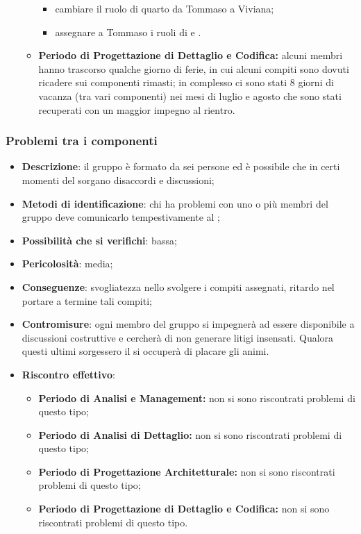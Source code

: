 \begin{itemize}
\begin{itemize}
\begin{itemize}
						\item cambiare il ruolo di quarto \PRJ {} da Tommaso a Viviana;
						\item assegnare a Tommaso i ruoli di \VER{} e \AN.
					\end{itemize}
            \item \textbf{Periodo di Progettazione di Dettaglio e Codifica:} alcuni membri hanno trascorso qualche giorno di ferie, in cui alcuni compiti sono dovuti ricadere sui componenti rimasti; in complesso ci sono stati 8 giorni di vacanza (tra vari componenti) nei mesi di luglio e agosto che sono stati recuperati con un maggior impegno al rientro.
			\end{itemize}
		\end{itemize}


		\subsubsection{Problemi tra i componenti}
		\begin{itemize}
			\item \textbf{Descrizione}: il gruppo è formato da sei persone ed è possibile che in certi momenti del  sorgano disaccordi e discussioni;
			\item \textbf{Metodi di identificazione}: chi ha problemi con uno o più membri del gruppo deve comunicarlo tempestivamente al \RES{};
			\item \textbf{Possibilità che si verifichi}: bassa;
			\item \textbf{Pericolosità}: media;
			\item \textbf{Conseguenze}: svogliatezza nello svolgere i compiti assegnati, ritardo nel portare a termine tali compiti;
			\item \textbf{Contromisure}: ogni membro del gruppo si impegnerà ad essere disponibile a discussioni costruttive e cercherà di non generare litigi insensati. Qualora questi ultimi sorgessero il \RES{} si occuperà di placare gli animi.
			\item \textbf{Riscontro effettivo}:
			\begin{itemize}
				\item \textbf{Periodo di Analisi e Management:} non si sono riscontrati problemi di questo tipo;
				\item \textbf{Periodo di Analisi di Dettaglio:} non si sono riscontrati problemi di questo tipo;
				\item \textbf{Periodo di Progettazione Architetturale:} non si sono riscontrati problemi di questo tipo;
            \item \textbf{Periodo di Progettazione di Dettaglio e Codifica:} non si sono riscontrati problemi di questo tipo.
			\end{itemize}
		\end{itemize}

